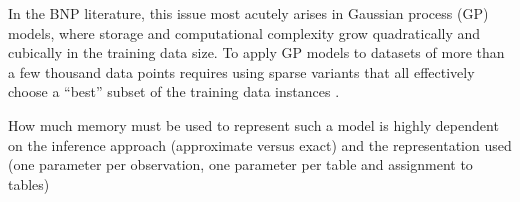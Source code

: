 {In the BNP literature, this issue most acutely arises in Gaussian process (GP) models, where storage and computational complexity grow quadratically and cubically in the training data size.  To apply GP models to datasets of more than a few thousand data points requires using sparse variants that all effectively choose a ``best'' subset of the training data instances \cite{snelson, csato, etc}.  



How much memory must be used to represent such a model is highly dependent on the inference approach (approximate versus exact) and the representation used (one parameter per observation, one parameter per table and assignment to tables)






}